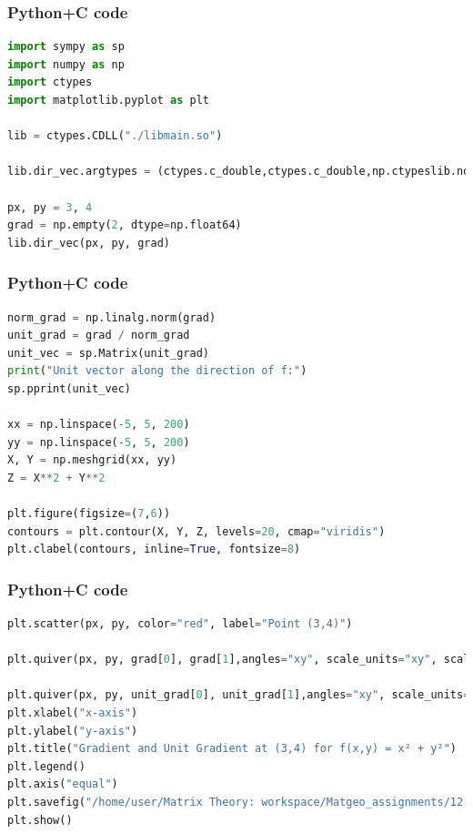 \documentclass{beamer}
\begin{document}
\begin{frame}[fragile]
    \frametitle{Python+C code}

    \begin{lstlisting}[language=Python]
import sympy as sp
import numpy as np
import ctypes
import matplotlib.pyplot as plt

lib = ctypes.CDLL("./libmain.so")

lib.dir_vec.argtypes = (ctypes.c_double,ctypes.c_double,np.ctypeslib.ndpointer(dtype=np.float64, ndim=1, flags="C_CONTIGUOUS"))

px, py = 3, 4
grad = np.empty(2, dtype=np.float64)
lib.dir_vec(px, py, grad)


    \end{lstlisting}
\end{frame}

\begin{frame}[fragile]
    \frametitle{Python+C code}

    \begin{lstlisting}[language=Python]
norm_grad = np.linalg.norm(grad)
unit_grad = grad / norm_grad
unit_vec = sp.Matrix(unit_grad)
print("Unit vector along the direction of f:")
sp.pprint(unit_vec)

xx = np.linspace(-5, 5, 200)
yy = np.linspace(-5, 5, 200)
X, Y = np.meshgrid(xx, yy)
Z = X**2 + Y**2

plt.figure(figsize=(7,6))
contours = plt.contour(X, Y, Z, levels=20, cmap="viridis")
plt.clabel(contours, inline=True, fontsize=8)
    \end{lstlisting}
\end{frame}

\begin{frame}[fragile]
    \frametitle{Python+C code}

    \begin{lstlisting}[language=Python]
plt.scatter(px, py, color="red", label="Point (3,4)")

plt.quiver(px, py, grad[0], grad[1],angles="xy", scale_units="xy", scale=1, color="blue", width=0.005,label="Full ∇f at (3,4)")

plt.quiver(px, py, unit_grad[0], unit_grad[1],angles="xy", scale_units="xy", scale=1, color="green", width=0.005,label="Unit ∇f at (3,4)")
plt.xlabel("x-axis")
plt.ylabel("y-axis")
plt.title("Gradient and Unit Gradient at (3,4) for f(x,y) = x² + y²")
plt.legend()
plt.axis("equal")
plt.savefig("/home/user/Matrix Theory: workspace/Matgeo_assignments/12.560/figs/Figure_1.png")
plt.show()
    \end{lstlisting}
\end{frame}
\end{document}
